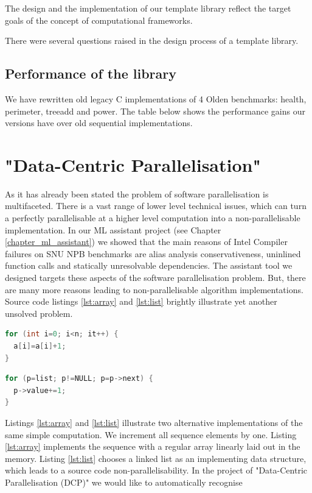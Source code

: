 \documentclass[10pt,a4paper]{report}
\begin{document}
\quad The design and the implementation of our template library reflect the target goals of the concept of computational frameworks.    

\quad There were several questions raised in the design process of a template library. 

\section{Performance of the library}
\quad We have rewritten old legacy C implementations of 4 Olden benchmarks: health, perimeter, treeadd and power. The table below shows the performance gains our versions have over old sequential implementations.

\chapter{"Data-Centric Parallelisation"}
\label{chapter_dcp}
\quad As it has already been stated the problem of software parallelisation is multifaceted. There is a vast range of lower level technical issues, which can turn a perfectly parallelisable at a higher level computation into a non-parallelisable implementation. In our ML assistant project (see Chapter \ref{chapter_ml_assistant}) we showed that the main reasons of Intel Compiler failures on SNU NPB benchmarks are alias analysis conservativeness, uninlined function calls and statically unresolvable dependencies. The assistant tool we designed targets these aspects of the software parallelisation problem. But, there are many more reasons leading to non-parallelisable algorithm implementations. Source code listings \ref{lst:array} and \ref{lst:list} brightly illustrate yet another unsolved problem.\newline\null
\begin{minipage}[t]{0.45\linewidth}
\begin{lstlisting}[caption={Parallelisable loop operating on a \textbf{linear array}.},label={lst:array},language=C]
for (int i=0; i<n; it++) {
  a[i]=a[i]+1;
}
\end{lstlisting}
\end{minipage}
%
\begin{minipage}[t]{0.55\linewidth}
\begin{lstlisting}[caption={Non-parallelisable loop operating on a \textbf{linked-list}.},label={lst:list},language=C]
for (p=list; p!=NULL; p=p->next) {
  p->value+=1;
}
\end{lstlisting}
\end{minipage}
\quad Listings \ref{lst:array} and \ref{lst:list} illustrate two alternative implementations of the same simple computation. We increment all sequence elements by one. Listing \ref{lst:array} implements the sequence with a regular array linearly laid out in the memory. Listing \ref{lst:list} chooses a linked list as an implementing data structure, which leads to a source code non-parallelisability.\newline\null
\quad In the project of "Data-Centric Parallelisation (DCP)" we would like to automatically recognise 
\end{document}
